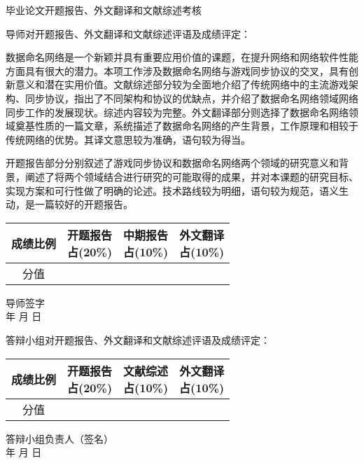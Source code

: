 \thispagestyle{empty}
\begin{center}
\stfangsong\sanhao 毕业论文开题报告、外文翻译和文献综述考核
\end{center}
\songti\sihao 导师对开题报告、外文翻译和文献综述评语及成绩评定：

数据命名网络是一个新颖并具有重要应用价值的课题，在提升网络和网络软件性能方面具有很大的潜力。本项工作涉及数据命名网络与游戏同步协议的交叉，具有创新意义和潜在实用价值。文献综述部分较为全面地介绍了传统网络中的主流游戏架构、同步协议，指出了不同架构和协议的优缺点，并介绍了数据命名网络领域网络同步工作的发展现状。综述内容较为完整。外文翻译部分则选择了数据命名网络领域奠基性质的一篇文章，系统描述了数据命名网络的产生背景，工作原理和相较于传统网络的优势。其译文意思较为准确，语句较为得当。

开题报告部分分别叙述了游戏同步协议和数据命名网络两个领域的研究意义和背景，阐述了将两个领域结合进行研究的可能取得的成果，并对本课题的研究目标、实现方案和可行性做了明确的论述。技术路线较为明细，语句较为规范，语义生动，是一篇较好的开题报告。
\vspace{1cm}

{
\hspace{3cm} \songti\xiaosi
\begin{tabular}{|c|c|c|c|}
    \hline
    成绩比例 & \parbox[t]{4em}{开题报告\\[-3.5em]占(20\%)} &
               \parbox[t]{4em}{中期报告\\[-3.5em]占(10\%)} &
               \parbox[t]{4em}{外文翻译\\[-3.5em]占(10\%)} \\

    \hline
    分值   & & &  \\
    \hline
\end{tabular}
}
\begin{flushright}
    导师签字\;\underline{\hspace{4em}}\\
    年 \quad 月 \quad 日
\end{flushright}
\vspace{-0cm}
{\songti\sihao 答辩小组对开题报告、外文翻译和文献综述评语及成绩评定：}
\vspace{4cm}

{
\hspace{3cm} \songti\xiaosi
\begin{tabular}{|c|c|c|c|}
    \hline
    成绩比例 & \parbox[t]{4em}{开题报告\\[-3.5em]占(20\%)} &
               \parbox[t]{4em}{文献综述\\[-3.5em]占(10\%)} &
               \parbox[t]{4em}{外文翻译\\[-3.5em]占(10\%)} \\

    \hline
    分值   & & &  \\
    \hline
\end{tabular}
}
\begin{flushright}
    答辩小组负责人（签名）\;\underline{\hspace{4em}}\\
    年 \quad 月 \quad 日
\end{flushright}

